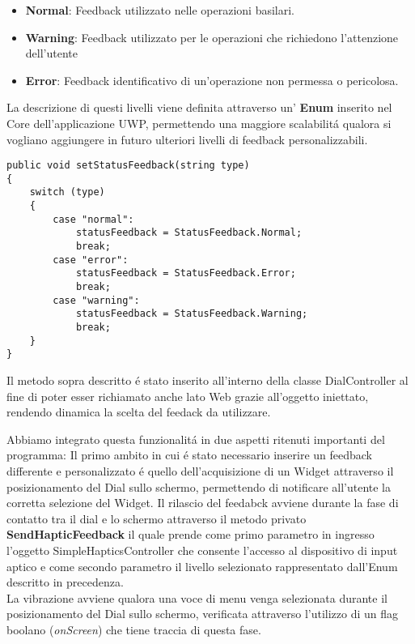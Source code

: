\begin{itemize}
\item \textbf{Normal}: Feedback utilizzato nelle operazioni basilari.
\item \textbf{Warning}: Feedback utilizzato per le operazioni che richiedono l'attenzione dell'utente
\item \textbf{Error}: Feedback identificativo di un'operazione non permessa o pericolosa.
\end{itemize} 

La descrizione di questi livelli viene definita attraverso un' \textbf{Enum} inserito nel Core dell'applicazione UWP, permettendo una maggiore scalabilitá qualora si vogliano aggiungere in futuro ulteriori livelli di feedback personalizzabili.

\vspace{1.0cm}
\begin{lstlisting}[caption={Selezione feedback corrente},style=javaScriptCode]
public void setStatusFeedback(string type)
{
	switch (type)
	{
		case "normal": 
			statusFeedback = StatusFeedback.Normal;
			break;
		case "error":
			statusFeedback = StatusFeedback.Error;
			break;
		case "warning":
			statusFeedback = StatusFeedback.Warning;
			break;
	}
}
\end{lstlisting} 
\vspace{1.0cm}

Il metodo sopra descritto é stato inserito all'interno della classe DialController al fine di poter esser richiamato anche lato Web grazie all'oggetto iniettato, rendendo dinamica la scelta del feedack da utilizzare.

Abbiamo integrato questa funzionalitá in due aspetti ritenuti importanti del programma:
Il primo ambito in cui é stato necessario inserire un feedback differente e personalizzato é quello dell'acquisizione di un Widget attraverso il posizionamento del Dial sullo schermo, permettendo di notificare all'utente la corretta selezione del Widget.
Il rilascio del feedabck avviene durante la fase di contatto tra il dial e lo schermo attraverso il metodo privato \textbf{SendHapticFeedback} il quale prende come primo parametro in ingresso l'oggetto SimpleHapticsController che consente l'accesso al dispositivo di input aptico e come secondo parametro il livello selezionato rappresentato dall'Enum descritto in precedenza.\\

La vibrazione avviene qualora una voce di menu venga selezionata durante il posizionamento del Dial sullo schermo, verificata attraverso l'utilizzo di un flag boolano (\emph{onScreen}) che tiene traccia di questa fase.

